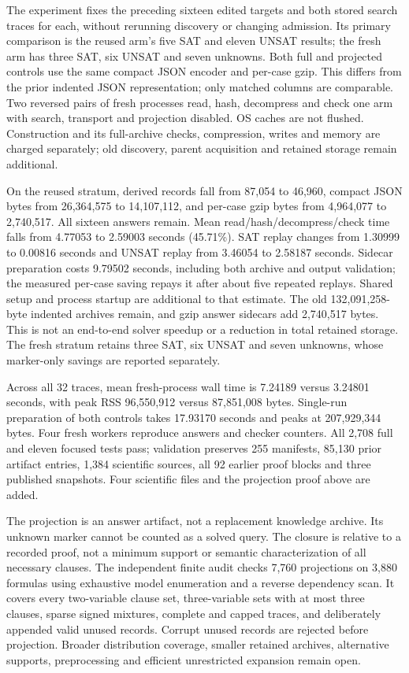 The experiment fixes the preceding sixteen edited targets and both stored search
traces for each, without rerunning discovery or changing admission. Its primary
comparison is the reused arm's five SAT and eleven UNSAT results; the fresh arm
has three SAT, six UNSAT and seven unknowns. Both full and projected controls
use the same compact JSON encoder and per-case gzip. This differs from the prior
indented JSON representation; only matched columns are comparable. Two reversed
pairs of fresh processes read, hash, decompress and check one arm with search,
transport and projection disabled. OS caches are not flushed. Construction and
its full-archive checks, compression, writes and memory are charged separately;
old discovery, parent acquisition and retained storage remain additional.

On the reused stratum, derived records fall from 87,054 to 46,960,
compact JSON bytes from 26,364,575 to 14,107,112, and per-case
gzip bytes from 4,964,077 to 2,740,517. All sixteen answers remain.
Mean read/hash/decompress/check time falls from 4.77053 to
2.59003 seconds (45.71\%). SAT replay changes from
1.30999 to 0.00816 seconds and UNSAT replay from
3.46054 to 2.58187 seconds. Sidecar preparation costs
9.79502 seconds, including both archive and output validation;
the measured per-case saving repays it after about five repeated replays.
Shared setup and process startup are additional to that estimate. The old
132,091,258-byte indented archives remain, and gzip answer sidecars add
2,740,517 bytes. This is not an end-to-end solver speedup or a reduction
in total retained storage. The fresh stratum retains three SAT, six UNSAT and
seven unknowns, whose marker-only savings are reported separately.

Across all 32 traces, mean fresh-process wall time is
7.24189 versus 3.24801 seconds, with peak RSS
96,550,912 versus 87,851,008 bytes. Single-run preparation of
both controls takes 17.93170 seconds and peaks at
207,929,344 bytes. Four fresh workers reproduce answers and
checker counters. All 2,708 full and eleven focused tests pass; validation
preserves 255 manifests, 85,130 prior artifact entries, 1,384 scientific sources,
all 92 earlier proof blocks and three published snapshots. Four scientific
files and the projection proof above are added.

The projection is an answer artifact, not a replacement knowledge archive.
Its unknown marker cannot be counted as a solved query. The closure is relative
to a recorded proof, not a minimum support or semantic characterization of all
necessary clauses. The independent finite audit checks 7,760 projections on
3,880 formulas using exhaustive model enumeration and a reverse dependency scan.
It covers every two-variable clause set, three-variable sets with at most three
clauses, sparse signed mixtures, complete and capped traces, and deliberately
appended valid unused records. Corrupt unused records are rejected before
projection. Broader distribution coverage, smaller retained archives, alternative
supports, preprocessing and efficient unrestricted expansion remain open.
